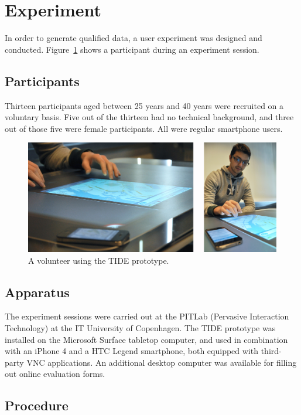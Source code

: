 \section{Experiment}
\label{sec:experiment}

In order to generate qualified data, a user experiment was designed and conducted.
Figure~\ref{fig:andrea} shows a participant during an experiment session.

\subsection{Participants}

Thirteen participants aged between 25 years and 40 years were recruited on a voluntary basis.
Five out of the thirteen had no technical background, and three out of those five were female participants.
All were regular smartphone users.

\begin{figure}[htb]
  \centering
    \includegraphics[width=1\textwidth]{images/tideandrea}
    \caption{A volunteer using the TIDE prototype.}
    \label{fig:andrea}
\end{figure}

\subsection{Apparatus}

The experiment sessions were carried out at the PITLab (Pervasive Interaction Technology) at the IT University of Copenhagen.
The TIDE prototype was installed on the Microsoft Surface tabletop computer, and used in combination with an iPhone 4 and a HTC Legend smartphone, both equipped with third-party VNC applications.
An additional desktop computer was available for filling out online evaluation forms.

\subsection{Procedure}

